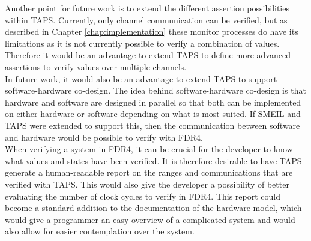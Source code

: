 Another point for future work is to extend the different assertion possibilities within TAPS. Currently, only channel communication can be verified, but as described in Chapter \ref{chap:implementation}
these monitor processes do have its limitations as it is not currently possible to verify a combination of values. Therefore it would be an advantage to extend TAPS to define more advanced assertions to verify values over multiple channels. \\

In future work, it would also be an advantage to extend TAPS to support software-hardware co-design. The idea behind software-hardware co-design is that hardware and software are designed in parallel so that both can be implemented on either hardware or software depending on what is most suited. If SMEIL and TAPS were extended to support this, then the communication between software and hardware would be possible to verify with FDR4. \\

When verifying a system in FDR4, it can be crucial for the developer to know what values and states have been verified. It is therefore desirable to have TAPS generate a human-readable report on the ranges and communications that are verified with TAPS. This would also give the developer a possibility of better evaluating the number of clock cycles to verify in FDR4.
This report could become a standard addition to the documentation of the hardware model, which would give a programmer an easy overview of a complicated system and would also allow for easier contemplation over the system.